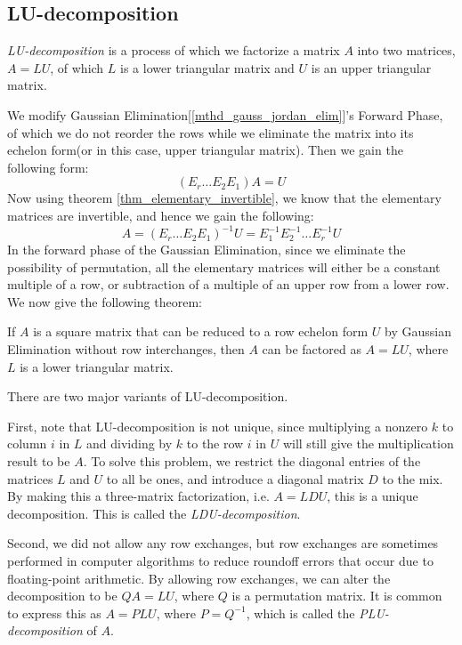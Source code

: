 \documentclass{report}
\begin{document}
		\subsection{LU-decomposition}
			\emph{LU-decomposition} is a process of which we factorize a matrix $A$ into two matrices, $A=LU$, of which $L$ is a lower triangular matrix and $U$ is an upper triangular matrix.
		
			We modify Gaussian Elimination[\ref{mthd_gauss_jordan_elim}]'s Forward Phase, of which we do not reorder the rows while we eliminate the matrix into its echelon form(or in this case, upper triangular matrix). Then we gain the following form:
			\begin{displaymath}
				(E_r\dots E_2E_1)A=U
			\end{displaymath}
			Now using theorem \ref{thm_elementary_invertible}, we know that the elementary matrices are invertible, and hence we gain the following:
			\begin{displaymath}
				A=(E_r\dots E_2E_1)^{-1}U=E_1^{-1}E_2^{-1}\dots E_r^{-1}U
			\end{displaymath}
			In the forward phase of the Gaussian Elimination, since we eliminate the possibility of permutation, all the elementary matrices will either be a constant multiple of a row, or subtraction of a multiple of an upper row from a lower row. We now give the following theorem:
			\begin{thm}
				If $A$ is a square matrix that can be reduced to a row echelon form $U$ by Gaussian Elimination without row interchanges, then $A$ can be factored as $A=LU$, where $L$ is a lower triangular matrix.
			\end{thm}
			
			There are two major variants of LU-decomposition.
			
			First, note that LU-decomposition is not unique, since multiplying a nonzero $k$ to column $i$ in $L$ and dividing by $k$ to the row $i$ in $U$ will still give the multiplication result to be $A$. To solve this problem, we restrict the diagonal entries of the matrices $L$ and $U$ to all be ones, and introduce a diagonal matrix $D$ to the mix. By making this a three-matrix factorization, i.e. $A=LDU$, this is a unique decomposition. This is called the \emph{LDU-decomposition}.
			
			Second, we did not allow any row exchanges, but row exchanges are sometimes performed in computer algorithms to reduce roundoff errors that occur due to floating-point arithmetic. By allowing row exchanges, we can alter the decomposition to be $QA=LU$, where $Q$ is a permutation matrix. It is common to express this as $A=PLU$, where $P=Q^{-1}$, which is called the \emph{PLU-decomposition} of $A$.
		
\end{document}

